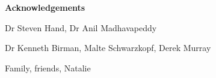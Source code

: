 \newpage
{\Huge \bf Acknowledgements}

\vspace{24pt} 

Dr Steven Hand, Dr Anil Madhavapeddy

Dr Kenneth Birman, Malte Schwarzkopf, Derek Murray

Family, friends, Natalie

\vfill

\newpage
\vspace*{\fill}
